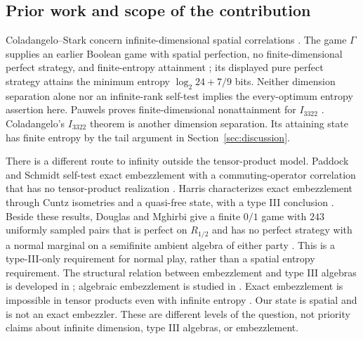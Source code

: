 \subsection{Prior work and scope of the contribution}
Coladangelo--Stark concern infinite-dimensional spatial correlations \cite{CS}. The game $\Gamma$ supplies an earlier Boolean game with spatial perfection, no finite-dimensional perfect strategy, and finite-entropy attainment \cite[Theorems 1.1 and 13.1]{Gamma}; its displayed pure perfect strategy attains the minimum entropy $\log_2 24+7/9$ bits. Neither dimension separation alone nor an infinite-rank self-test implies the every-optimum entropy assertion here. Pauwels proves finite-dimensional nonattainment for $I_{3322}$ \cite{Pauwels}. Coladangelo's $I_{3322}$ theorem \cite{I3322} is another dimension separation. Its attaining state has finite entropy by the tail argument in Section~\ref{sec:discussion}.

There is a different route to infinity outside the tensor-product model. Paddock and Schmidt self-test exact embezzlement with a commuting-operator correlation that has no tensor-product realization \cite{PS}. Harris characterizes exact embezzlement through Cuntz isometries and a quasi-free state, with a type III conclusion \cite{Harris}. Beside these results, Douglas and Mghirbi give a finite $0/1$ game with $243$ uniformly sampled pairs that is perfect on $R_{1/2}$ and has no perfect strategy with a normal marginal on a semifinite ambient algebra of either party \cite[Theorem 1.1]{ReadType}. This is a type-III-only requirement for normal play, rather than a spatial entropy requirement. The structural relation between embezzlement and type III algebras is developed in \cite{vLSWW,multipartite}; algebraic embezzlement is studied in \cite{Liu}. Exact embezzlement is impossible in tensor products even with infinite entropy \cite{CLP}. Our state is spatial and is not an exact embezzler. These are different levels of the question, not priority claims about infinite dimension, type III algebras, or embezzlement.

